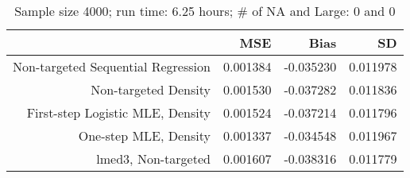 \begin{table}[ht]
\centering
\caption{Sample size 4000; run time: 6.25 hours; # of NA and Large:  0 and 0} 
\begin{tabular}{rrrr}
  \hline
 & MSE & Bias & SD \\ 
  \hline
Non-targeted Sequential Regression & 0.001384 & -0.035230 & 0.011978 \\ 
  Non-targeted Density & 0.001530 & -0.037282 & 0.011836 \\ 
  First-step Logistic MLE, Density & 0.001524 & -0.037214 & 0.011796 \\ 
  One-step MLE, Density & 0.001337 & -0.034548 & 0.011967 \\ 
  lmed3, Non-targeted & 0.001607 & -0.038316 & 0.011779 \\ 
   \hline
\end{tabular}
\end{table}
